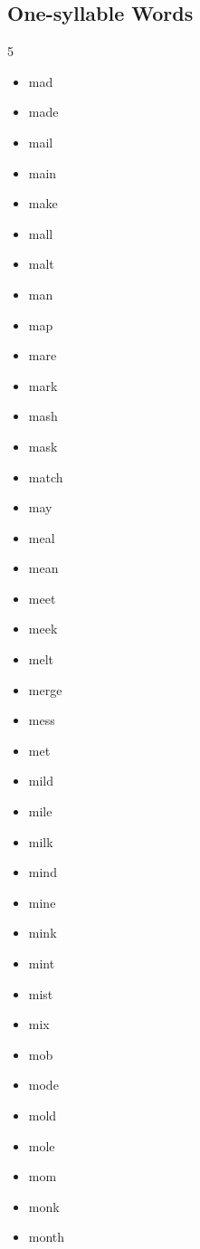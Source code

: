 \documentclass{article}
\begin{document}
\subsection*{One-syllable Words}
\begin{multicols}{5}
    \begin{itemize}
        \item mad
        \item made
        \item mail
        \item main
        \item make
        \item mall
        \item malt
        \item man
        \item map
        \item mare
        \item mark
        \item mash
        \item mask
        \item match
        \item may
        \item meal
        \item mean
        \item meet
        \item meek
        \item melt
        \item merge
        \item mess
        \item met
        \item mild
        \item mile
        \item milk
        \item mind
        \item mine
        \item mink
        \item mint
        \item mist
        \item mix
        \item mob
        \item mode
        \item mold
        \item mole
        \item mom
        \item monk
        \item month

\end{itemize}
\end{multicols}
\end{document}
